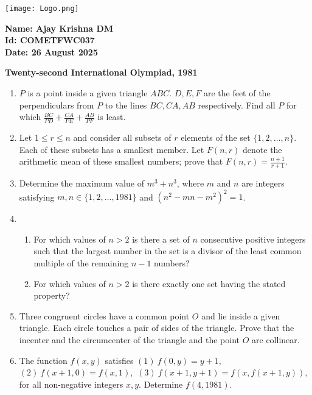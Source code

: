 \documentclass[12pt]{article}
\begin{document}
\begin{minipage}{0.45\textwidth}
  \texttt{[image: Logo.png]}
\end{minipage}
\hfill
\begin{minipage}{0.45\textwidth}
  \raggedleft
  \textbf{Name: Ajay Krishna DM}\\
  \textbf{Id: COMETFWC037}\\
  \textbf{Date: 26 August 2025}\\
\end{minipage}

\vspace{1cm}

\begin{center}
\textbf{Twenty-second International Olympiad, 1981}
\end{center}

\begin{enumerate}
  \item $P$ is a point inside a given triangle $ABC$. $D, E, F$ are the feet of the perpendiculars from $P$ to the lines $BC, CA, AB$ respectively. Find all $P$ for which  
  $ \frac{BC}{PD} + \frac{CA}{PE} + \frac{AB}{PF} $  
  is least.

  \item Let $1 \leq r \leq n$ and consider all subsets of $r$ elements of the set $\{1,2,\ldots,n\}$. Each of these subsets has a smallest member. Let $F(n,r)$ denote the arithmetic mean of these smallest numbers; prove that  
  $ F(n,r) = \frac{n+1}{r+1} $.

  \item Determine the maximum value of $m^3+n^3$, where $m$ and $n$ are integers satisfying $m,n \in \{1,2,\ldots,1981\}$ and $(n^2-mn-m^2)^2 = 1$.

  \item 
  \begin{enumerate}
    \item For which values of $n > 2$ is there a set of $n$ consecutive positive integers such that the largest number in the set is a divisor of the least common multiple of the remaining $n-1$ numbers?
    \item For which values of $n > 2$ is there exactly one set having the stated property?
  \end{enumerate}

  \item Three congruent circles have a common point $O$ and lie inside a given triangle. Each circle touches a pair of sides of the triangle. Prove that the incenter and the circumcenter of the triangle and the point $O$ are collinear.

  \item The function $f(x,y)$ satisfies  
  $ (1)\ f(0,y) = y+1, $  
  $ (2)\ f(x+1,0) = f(x,1), $  
  $ (3)\ f(x+1,y+1) = f(x, f(x+1,y)), $  
  for all non-negative integers $x,y$. Determine $f(4,1981)$.
\end{enumerate}
\end{document}
